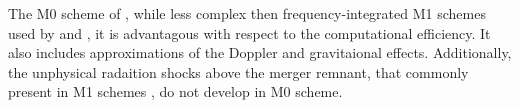 The M0 scheme of \citet{Radice:2016dwd}, while less complex then frequency-integrated M1 schemes used by 
\citet{Sekiguchi:2015dma} and \citet{Foucart:2015vpa}, it is advantagous with respect to the computational efficiency.
It also includes approximations of the Doppler and gravitaional effects. 
Additionally, the unphysical radaition shocks above the merger remnant, that commonly present in M1 schemes \citep{Foucart:2018gis}, do not develop in M0 scheme.





%
%


